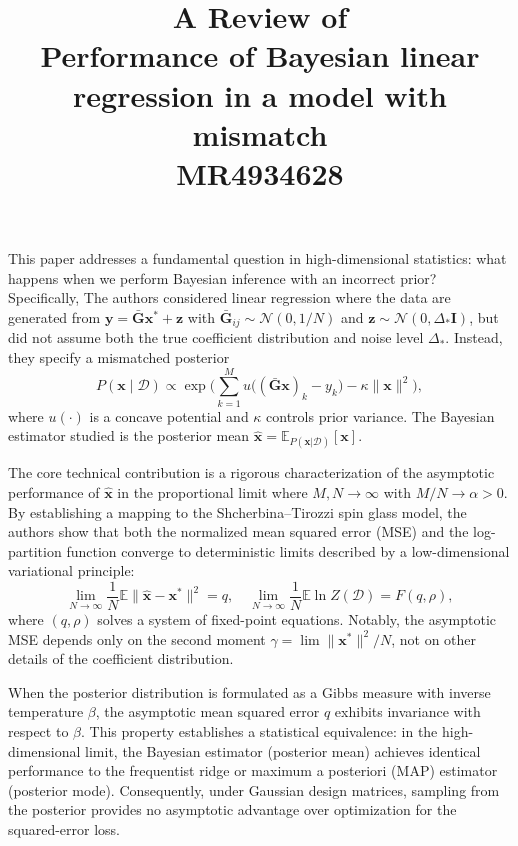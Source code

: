 \documentclass[11pt]{article}
\title{A Review of \\Performance of Bayesian linear regression in a model with mismatch \\ MR4934628}
\begin{document}
	\maketitle	


This paper addresses a fundamental question in high-dimensional statistics: what happens when we perform Bayesian inference with an incorrect prior? Specifically,  The authors considered linear regression where the data are generated from $\mathbf{y} = \bar{\mathbf{G}}\mathbf{x}^* + \mathbf{z}$ with $\bar{\mathbf{G}}_{ij} \sim \mathcal{N}(0,1/N)$ and $\mathbf{z} \sim \mathcal{N}(0, \Delta_*\mathbf{I})$, but did not assume both the true coefficient distribution and noise level $\Delta_*$. Instead, they specify a mismatched posterior
$$
P(\mathbf{x} \mid \mathcal{D}) \propto \exp\Big( \sum_{k=1}^M u\big((\bar{\mathbf{G}}\mathbf{x})_k - y_k\big) - \kappa \|\mathbf{x}\|^2 \Big),
$$
where $u(\cdot)$ is a concave potential and $\kappa$ controls prior variance. The Bayesian estimator studied is the posterior mean $\widehat{\mathbf{x}} = \mathbb{E}_{P(\mathbf{x}|\mathcal{D})}[\mathbf{x}]$.

The core technical contribution is a rigorous characterization of the asymptotic performance of $\widehat{\mathbf{x}}$ in the proportional limit where $M, N \to \infty$ with $M/N \to \alpha > 0$. By establishing a mapping to the Shcherbina–Tirozzi spin glass model, the authors show that both the normalized mean squared error (MSE) and the log-partition function converge to deterministic limits described by a low-dimensional variational principle:
$$
\lim_{N \to \infty} \frac{1}{N} \mathbb{E} \|\widehat{\mathbf{x}} - \mathbf{x}^*\|^2 = q, \quad \lim_{N \to \infty} \frac{1}{N} \mathbb{E} \ln Z(\mathcal{D}) = F(q, \rho),
$$
where $(q, \rho)$ solves a system of fixed-point equations. Notably, the asymptotic MSE depends only on the second moment $\gamma = \lim \|\mathbf{x}^*\|^2/N$, not on other details of the coefficient distribution.

When the posterior distribution is formulated as a Gibbs measure with inverse temperature $\beta$, the asymptotic mean squared error $q$ exhibits invariance with respect to $\beta$. This property establishes a statistical equivalence: in the high-dimensional limit, the Bayesian estimator (posterior mean) achieves identical performance to the frequentist ridge or maximum a posteriori (MAP) estimator (posterior mode). Consequently, under Gaussian design matrices, sampling from the posterior provides no asymptotic advantage over optimization for the squared-error loss.
\end{document}
